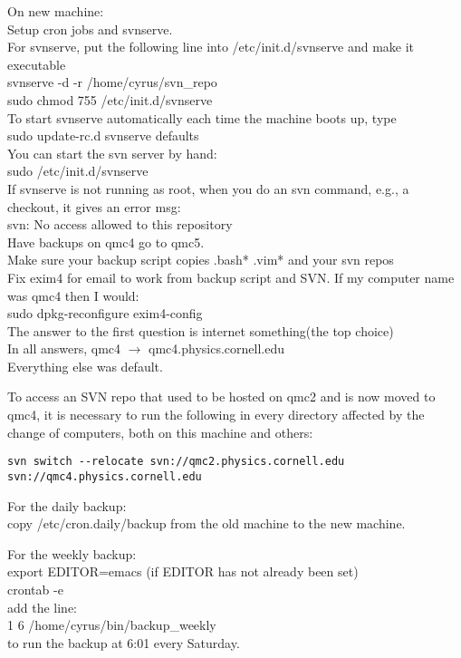 \documentclass[12pt]{article}
\begin{document}
On new machine: \\
Setup cron jobs and svnserve. \\
For svnserve, put the following line into /etc/init.d/svnserve and make it executable\\
svnserve -d -r /home/cyrus/svn\_repo \\
sudo chmod 755 /etc/init.d/svnserve \\
To start svnserve automatically each time the machine boots up, type \\
sudo update-rc.d svnserve defaults \\
You can start the svn server by hand: \\
sudo /etc/init.d/svnserve \\
If svnserve is not running as root, when you do an svn command, e.g., a checkout, it gives an error msg: \\
svn: No access allowed to this repository\\
Have backups on qmc4 go to qmc5. \\
Make sure your backup script copies .bash* .vim* and your svn repos \\
Fix exim4 for email to work from backup script and SVN. If my computer name was qmc4 then I would:\\
sudo dpkg-reconfigure exim4-config \\
The answer to the first question is internet something(the top choice) \\
In all answers, qmc4 $\rightarrow$ qmc4.physics.cornell.edu\\
Everything else was default.

To access an SVN repo that used to be hosted on qmc2 and is now moved to qmc4, it is necessary to run the following in every directory affected by the change of computers,
both on this machine and others:
\vspace{-2mm}
\begin{verbatim}
svn switch --relocate svn://qmc2.physics.cornell.edu svn://qmc4.physics.cornell.edu
\end{verbatim}

For the daily backup:\\
copy /etc/cron.daily/backup from the old machine to the new machine.

For the weekly backup:\\
export EDITOR=emacs (if EDITOR has not already been set)\\
crontab -e \\
add the line: \\
1 6 \*  /home/cyrus/bin/backup\_weekly \\
to run the backup at 6:01 every Saturday.
\end{document}
